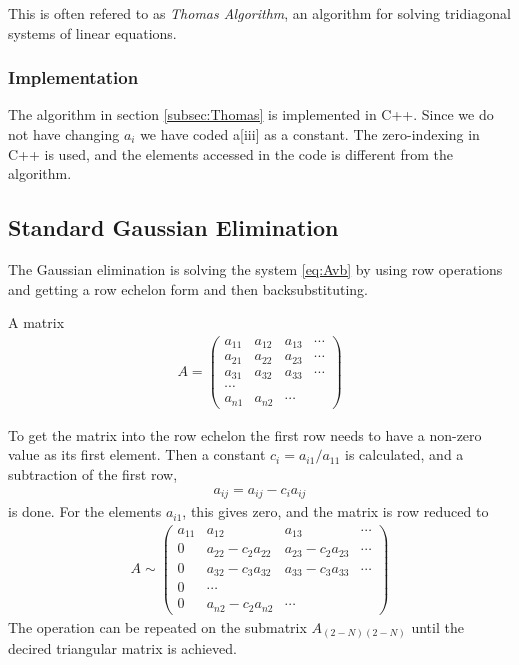 \documentclass[11pt,a4paper,english,final]{article}
\numberwithin{equation}{section}
\begin{document}
This is often refered to as \emph{Thomas Algorithm}, an algorithm for solving tridiagonal systems of linear equations. 

\subsubsection{Implementation}

The algorithm in section \ref{subsec:Thomas} is implemented in C++.
Since we do not have changing $a_i$ we have coded a[iii] as a constant.
The zero-indexing in C++ is used, and the elements accessed in the code
is different from the algorithm.

\subsection{Standard Gaussian Elimination}

The Gaussian elimination is solving the system \eqref{eq:Avb} by using 
row operations and getting a row echelon form and then backsubstituting.

A matrix
\begin{gather}
A = \begin{pmatrix}
    a_{11} & a_{12} & a_{13} & \cdots\\
    a_{21} & a_{22} & a_{23} & \cdots\\
    a_{31} & a_{32} & a_{33} & \cdots\\
    \cdots \\
    a_{n1} & a_{n2} & \cdots
    \end{pmatrix}
\end{gather}

To get the matrix into the row echelon the first row needs to have a non-zero
value as its first element. Then a constant $c_i = a_{i1}/a_{11}$ is 
calculated, and a subtraction of the first row,
\begin{gather}
a_{ij} = a_{ij} - c_i a_{ij}
\end{gather}
is done. For the elements $a_{i1}$, this gives zero, and the matrix is
row reduced to
\begin{gather}
A \sim
\begin{pmatrix}
    a_{11} & a_{12} & a_{13} & \cdots\\
    0 & a_{22} - c_2 a_{22} & a_{23} - c_2 a_{23} & \cdots\\
    0 & a_{32} - c_3 a_{32} & a_{33} - c_3 a_{33} & \cdots\\
    0 & \cdots \\
    0 & a_{n2} - c_2 a_{n2} & \cdots
\end{pmatrix}
\end{gather}
The operation can be repeated on the submatrix $A_{(2-N)(2-N)}$
until the decired triangular matrix is achieved.
\end{document}
